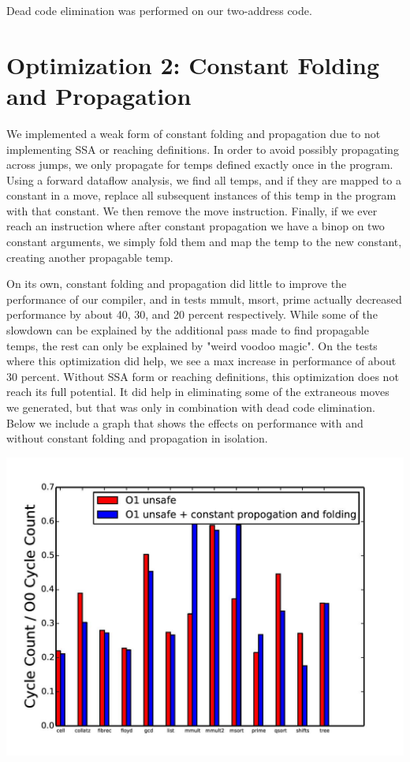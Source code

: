 \documentclass{article}
\begin{document}
Dead code elimination was performed on our two-address code.

\section{Optimization 2: Constant Folding and Propagation}

We implemented a weak form of constant folding and propagation due to not implementing SSA or reaching definitions. In order to avoid possibly propagating across jumps, we only propagate for temps defined exactly once in the program. Using a forward dataflow analysis, we find all temps, and if they are mapped to a constant in a move, replace all subsequent instances of this temp in the program with that constant. We then remove the move instruction. Finally, if we ever reach an instruction where after constant propagation we have a binop on two constant arguments, we simply fold them and map the temp to the new constant, creating another propagable temp.

On its own, constant folding and propagation did little to improve the performance of our compiler, and in tests mmult, msort, prime actually decreased performance by about 40, 30, and 20 percent respectively. While some of the slowdown can be explained by the additional pass made to find propagable temps, the rest can only be explained by "weird voodoo magic". On the tests where this optimization did help, we see a max increase in performance of about 30 percent. Without SSA form or reaching definitions, this optimization does not reach its full potential. It did help in eliminating some of the extraneous moves we generated, but that was only in combination with dead code elimination. Below we include a graph that shows the effects on performance with and without constant folding and propagation in isolation.

\includegraphics[scale=0.5]{O1_vs_constOpts-page-001}
\end{document}
